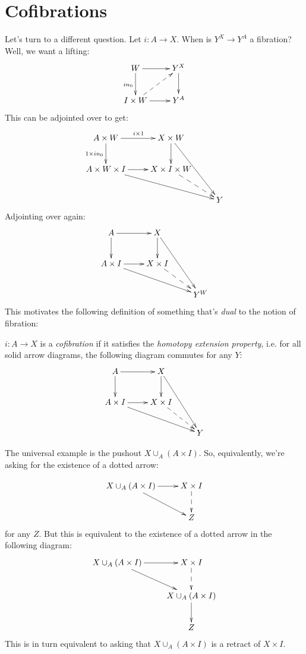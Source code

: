 \section{Cofibrations}
Let's turn to a different question. Let $i:A\to X$. When is $Y^X\to Y^A$ a fibration? Well, we want a lifting:
\begin{equation*}
    \xymatrix{
	W\ar[r]\ar[d]_{in_0} & Y^X\ar[d]\\
	I\times W\ar@{-->}[ur]\ar[r] & Y^A
    }
\end{equation*}
This can be adjointed over to get:
\begin{equation*}
    \xymatrix{
	A\times W\ar[r]^{i\times 1}\ar[d]_{1\times in_0} & X\times W\ar[d]\ar[ddr]& \\
	A\times W\times I \ar[r]\ar[drr] & X\times I\times W\ar@{-->}[dr] & \\
	& & Y
    }
\end{equation*}
Adjointing over again:
\begin{equation*}
    \xymatrix{
	A\ar[r]\ar[d] & X\ar[d]\ar[ddr] & \\
	A\times I\ar[r]\ar[drr] & X\times I\ar@{-->}[dr] & \\
	& & Y^W
    }
\end{equation*}
This motivates the following definition of something that's \emph{dual} to the notion of fibration:
\begin{definition}
    $i:A\to X$ is a \emph{cofibration} if it satisfies the \emph{homotopy extension property}, i.e. for all solid arrow diagrams, the following diagram commutes for any $Y$:
    \begin{equation*}
    \xymatrix{
	A\ar[r]\ar[d] & X\ar[d]\ar[ddr] & \\
	A\times I\ar[r]\ar[drr] & X\times I\ar@{-->}[dr] & \\
	& & Y
    }
    \end{equation*}
\end{definition}
The universal example is the pushout $X\cup_A (A\times I)$. So, equivalently, we're asking for the existence of a dotted arrow:

\begin{equation*}
    \xymatrix{
	X\cup_A (A\times I)\ar[r]\ar[dr] & X\times I\ar@{-->}[d]\\
	& Z
    }
\end{equation*}
for any $Z$. But this is equivalent to the existence of a dotted arrow in the following diagram:
\begin{equation*}
    \xymatrix{
	X\cup_A (A\times I)\ar[r]\ar[dr] & X\times I\ar@{-->}[d]\\
	& X\cup_A(A\times I)\ar[d]\\
	& Z
    }
\end{equation*}
This is in turn equivalent to asking that $X\cup_A (A\times I)$ is a retract of $X\times I$.

